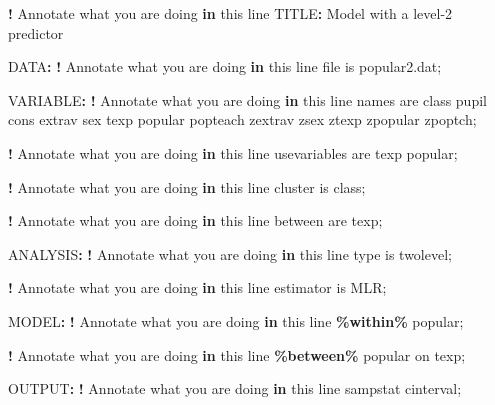 \documentclass[
]{book}
\newenvironment{Shaded}{\begin{snugshade}}{\end{snugshade}}
\newcommand{\ControlFlowTok}[1]{\textcolor[rgb]{0.13,0.29,0.53}{\textbf{#1}}}
\newcommand{\DecValTok}[1]{\textcolor[rgb]{0.00,0.00,0.81}{#1}}
\newcommand{\NormalTok}[1]{#1}
\newcommand{\SpecialCharTok}[1]{\textcolor[rgb]{0.81,0.36,0.00}{\textbf{#1}}}
\begin{document}
\begin{Shaded}
\begin{Highlighting}[]
\SpecialCharTok{!}\NormalTok{ Annotate what you are doing }\ControlFlowTok{in}\NormalTok{ this line}
\NormalTok{TITLE}\SpecialCharTok{:}\NormalTok{ Model with a level}\DecValTok{{-}2}\NormalTok{ predictor}

\NormalTok{DATA}\SpecialCharTok{:}
    \SpecialCharTok{!}\NormalTok{ Annotate what you are doing }\ControlFlowTok{in}\NormalTok{ this line}
\NormalTok{    file is popular2.dat;}

\NormalTok{VARIABLE}\SpecialCharTok{:}
    \SpecialCharTok{!}\NormalTok{ Annotate what you are doing }\ControlFlowTok{in}\NormalTok{ this line}
\NormalTok{    names are class pupil cons extrav sex texp popular popteach zextrav}
\NormalTok{    zsex ztexp zpopular zpoptch;}
    
    \SpecialCharTok{!}\NormalTok{ Annotate what you are doing }\ControlFlowTok{in}\NormalTok{ this line}
\NormalTok{    usevariables are texp popular;}
    
    \SpecialCharTok{!}\NormalTok{ Annotate what you are doing }\ControlFlowTok{in}\NormalTok{ this line}
\NormalTok{    cluster is class;}
    
    \SpecialCharTok{!}\NormalTok{ Annotate what you are doing }\ControlFlowTok{in}\NormalTok{ this line}
\NormalTok{    between are texp;}

\NormalTok{ANALYSIS}\SpecialCharTok{:}
    \SpecialCharTok{!}\NormalTok{ Annotate what you are doing }\ControlFlowTok{in}\NormalTok{ this line}
\NormalTok{    type is twolevel;}
    
    \SpecialCharTok{!}\NormalTok{ Annotate what you are doing }\ControlFlowTok{in}\NormalTok{ this line}
\NormalTok{    estimator is MLR;}

\NormalTok{MODEL}\SpecialCharTok{:}
    \SpecialCharTok{!}\NormalTok{ Annotate what you are doing }\ControlFlowTok{in}\NormalTok{ this line}
    \SpecialCharTok{\%within\%}
\NormalTok{    popular;}

    \SpecialCharTok{!}\NormalTok{ Annotate what you are doing }\ControlFlowTok{in}\NormalTok{ this line}
    \SpecialCharTok{\%between\%}
\NormalTok{    popular on texp;}

\NormalTok{OUTPUT}\SpecialCharTok{:}
    \SpecialCharTok{!}\NormalTok{ Annotate what you are doing }\ControlFlowTok{in}\NormalTok{ this line}
\NormalTok{    sampstat cinterval;}
\end{Highlighting}
\end{Shaded}
\end{document}
